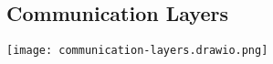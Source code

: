 \subsection{Communication Layers}

\begin{center}
    \texttt{[image: communication-layers.drawio.png]}
\end{center}

